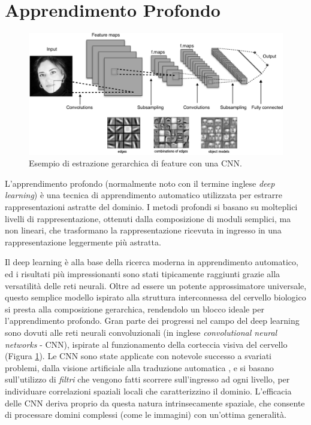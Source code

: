 \section*{Apprendimento Profondo}
%
\begin{figure}[t]
    \includegraphics[width=\textwidth]{pictures/abs_cnn}
    \centering
    \caption[Esempio di estrazione di feature con una CNN]{Esempio
	    di estrazione gerarchica di feature con una CNN.}
    \label{f:abs_cnn}
\end{figure}
%
L'apprendimento profondo (normalmente noto con il termine inglese 
\textit{deep learning}) \`e una tecnica di apprendimento automatico utilizzata
per estrarre rappresentazioni astratte del dominio. 
I metodi profondi si basano su molteplici livelli di rappresentazione,
ottenuti dalla composizione di moduli semplici, ma non lineari, che trasformano 
la rappresentazione ricevuta in ingresso in una rappresentazione leggermente 
pi\`u astratta. 

Il deep learning \`e alla base della ricerca moderna in 
apprendimento automatico, ed i risultati pi\`u impressionanti sono stati 
tipicamente raggiunti grazie alla versatilit\`a delle reti neurali.
Oltre ad essere un potente approssimatore universale, questo semplice modello 
ispirato alla struttura interconnessa del cervello biologico si presta alla 
composizione gerarchica, rendendolo un blocco ideale per l'apprendimento 
profondo.
Gran parte dei progressi nel campo del deep learning sono dovuti alle reti 
neurali convoluzionali (in inglese \textit{convolutional neural networks} - CNN), 
ispirate al funzionamento della corteccia visiva del cervello (Figura \ref{f:abs_cnn}). 
Le CNN sono state applicate con notevole successo a svariati problemi, dalla 
visione artificiale \cite{krizhevsky2012imagenet, szegedy2015going} alla 
traduzione automatica \cite{wu2016google}, e si basano sull'utilizzo di 
\textit{filtri} che vengono fatti scorrere sull'ingresso ad ogni livello, per 
individuare correlazioni spaziali locali che caratterizzino il dominio. 
L'efficacia delle CNN deriva proprio da questa natura intrinsecamente spaziale, 
che consente di processare domini complessi (come le immagini) con un'ottima 
generalit\`a.

